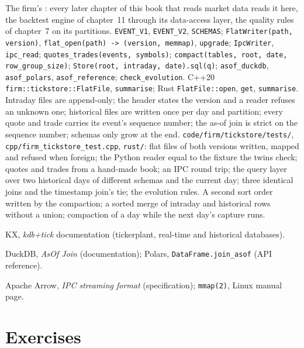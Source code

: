 \begin{build}
 The firm's : every later chapter of this book that reads market data reads it here, the backtest
engine of chapter~11 through its data-access layer, the quality rules of chapter~7 on its partitions.
 \texttt{EVENT\_V1}, \texttt{EVENT\_V2}, \texttt{SCHEMAS}; \texttt{FlatWriter(path, version)},
\texttt{flat\_open(path) -> (version, memmap)}, \texttt{upgrade}; \texttt{IpcWriter}, \texttt{ipc\_read};
\texttt{quotes\_trades(events, symbols)}; \texttt{compact(tables, root, date, row\_group\_size)}; \texttt{Store(root, intraday,
date).sql(q)}; \texttt{asof\_duckdb}, \texttt{asof\_polars}, \texttt{asof\_reference}; \texttt{check\_evolution}. C++20
\texttt{firm::tickstore::FlatFile}, \texttt{summarise}; Rust \texttt{FlatFile::open}, \texttt{get}, \texttt{summarise}.
 Intraday files are append-only; the header states the version and a reader refuses an unknown one; historical
files are written once per day and partition; every quote and trade carries its event's sequence number; the as-of join is
strict on the sequence number; schemas only grow at the end.
 \texttt{code/firm/tickstore/tests/}, \texttt{cpp/firm\_tickstore\_test.cpp}, \texttt{rust/}: flat files of
both versions written, mapped and refused when foreign; the Python reader equal to the fixture the twins check; quotes and trades
from a hand-made book; an IPC round trip; the query layer over two historical days of different schemas and the current day;
three identical joins and the timestamp join's tie; the evolution rules.
 A second sort order written by the compaction; a sorted merge of intraday and historical rows without a union;
compaction of a day while the next day's capture runs.
\end{build}

\begin{omsources}
\item KX, \emph{kdb+tick} documentation (tickerplant, real-time and historical databases).
\item DuckDB, \emph{AsOf Join} (documentation); Polars, \texttt{DataFrame.join\_asof} (API reference).
\item Apache Arrow, \emph{IPC streaming format} (specification); \texttt{mmap(2)}, Linux manual page.
\end{omsources}

\section{Exercises}

